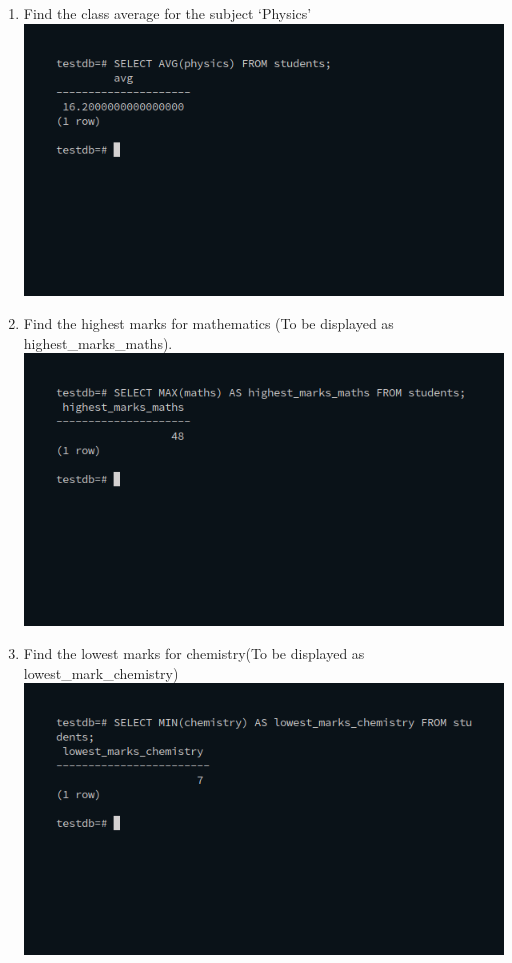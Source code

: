 \documentclass[10pt,a4paper,titlepage]{report}
\begin{document}
{\begin{enumerate}
	\item Find the class average for the subject ‘Physics’\newline
		\includegraphics[width=\linewidth]{../Images/Aggregate/1.png}\newline
\item Find the highest marks for mathematics (To be displayed as highest\_marks\_maths).\newline
		\includegraphics[width=\linewidth]{../Images/Aggregate/2.png}\newline
\item Find the lowest marks for chemistry(To be displayed as lowest\_mark\_chemistry)\newline
		\includegraphics[width=\linewidth]{../Images/Aggregate/3.png}\newline

\end{enumerate}}
\end{document}
